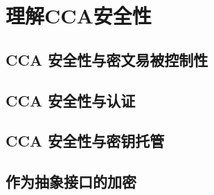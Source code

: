 \section{理解CCA安全性}\label{sec:12-2}

\subsection{CCA 安全性与密文易被控制性}\label{subsec:12-2-1}

\subsection{CCA 安全性与认证}\label{subsec:12-2-2}

\subsection{CCA 安全性与密钥托管}\label{subsec:12-2-3}

\subsection{作为抽象接口的加密}\label{subsec:12-2-4}